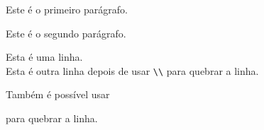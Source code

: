 \documentclass{article}
\begin{document}
Este é o primeiro parágrafo.


Este é o segundo parágrafo.

\bigbreak

Esta é uma linha. \\

Esta é outra linha depois de usar  \verb|\\| para quebrar a linha.

\bigbreak

Também é possível usar \newline

para quebrar a linha.
\end{document}
